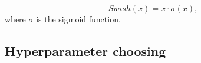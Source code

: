 \documentclass[letterpaper]{article}
\begin{document}
\[ Swish(x) = x\cdot \sigma(x), \]
where \( \sigma  \) is the sigmoid function.





\subsection{Hyperparameter choosing}
\end{document}

